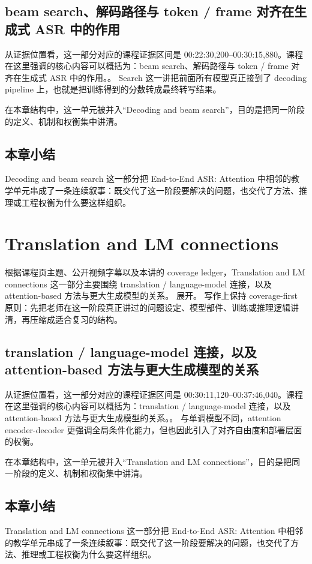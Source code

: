 \documentclass[a4paper]{article}
\begin{document}
\subsection{beam search、解码路径与 token / frame 对齐在生成式 ASR 中的作用}
从证据位置看，这一部分对应的课程证据区间是 00:22:30,200--00:30:15,880。课程在这里强调的核心内容可以概括为：beam search、解码路径与 token / frame 对齐在生成式 ASR 中的作用。。
Search 这一讲把前面所有模型真正接到了 decoding pipeline 上，也就是把训练得到的分数转成最终转写结果。

在本章结构中，这一单元被并入“Decoding and beam search”，目的是把同一阶段的定义、机制和权衡集中讲清。

\subsection{本章小结}
Decoding and beam search 这一部分把 End-to-End ASR: Attention 中相邻的教学单元串成了一条连续叙事：既交代了这一阶段要解决的问题，也交代了方法、推理或工程权衡为什么要这样组织。

\section{Translation and LM connections}
根据课程页主题、公开视频字幕以及本讲的 coverage ledger，Translation and LM connections 这一部分主要围绕 translation / language-model 连接，以及 attention-based 方法与更大生成模型的关系。 展开。
写作上保持 coverage-first 原则：先把老师在这一阶段真正讲过的问题设定、模型部件、训练或推理逻辑讲清，再压缩成适合复习的结构。

\subsection{translation / language-model 连接，以及 attention-based 方法与更大生成模型的关系}
从证据位置看，这一部分对应的课程证据区间是 00:30:11,120--00:37:46,040。课程在这里强调的核心内容可以概括为：translation / language-model 连接，以及 attention-based 方法与更大生成模型的关系。。
与单调模型不同，attention encoder-decoder 更强调全局条件化能力，但也因此引入了对齐自由度和部署层面的权衡。

在本章结构中，这一单元被并入“Translation and LM connections”，目的是把同一阶段的定义、机制和权衡集中讲清。

\subsection{本章小结}
Translation and LM connections 这一部分把 End-to-End ASR: Attention 中相邻的教学单元串成了一条连续叙事：既交代了这一阶段要解决的问题，也交代了方法、推理或工程权衡为什么要这样组织。
\end{document}
